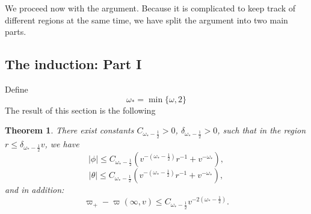 \documentclass{article}
\newtheorem{theorem}{Theorem}[section]
\begin{document}
We proceed now with the argument. Because it is complicated to 
keep track of different regions at the same time, we have split the
argument into two main parts.

\subsection{The induction: Part I}
\label{PartIa}
Define
\[
\omega_*=\min\{\omega,2\}
\]
The result of this section is the following
\begin{theorem}
\label{3/2}
There exist constants $C_{\omega_*-\frac12}>0$, 
$\delta_{\omega_*-\frac12}>0$, such that
in the region $r\le\delta_{\omega_*-\frac12} v$, we have
\begin{equation}
\label{+}
|\phi|\le C_{\omega_*-\frac12}\left(v^{-\left(\omega_*-\frac12\right)}r^{-1}+
v^{-\omega_*}\right),
\end{equation}
\begin{equation}
\label{+++}
|\theta|\le C_{\omega_*-\frac12}\left(v^{-\left(\omega_*-\frac12\right)}r^{-1}
+v^{-\omega_*}\right),
\end{equation}
and in addition: 
\[
\varpi_+-\varpi(\infty,v)\le C_{\omega_*-\frac12}v^{-2\left(\omega_*-\frac12\right)}.
\]
\end{theorem}
\end{document}
